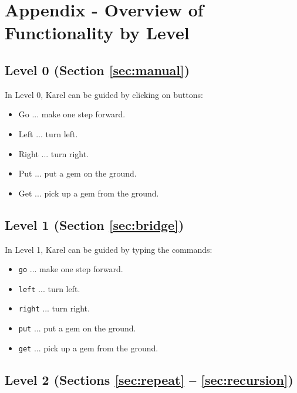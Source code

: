 \documentclass[article,A4,12pt]{llncs}
\begin{document}

\section{Appendix - Overview of Functionality by Level}\label{sec:newfunc3}

\subsection{Level 0 (Section \ref{sec:manual})}

In Level 0, Karel can be guided by clicking on buttons:
\begin{itemize}
\item Go ... make one step forward.
\item Left ... turn left.
\item Right ... turn right.
\item Put ... put a gem on the ground.
\item Get ... pick up a gem from the ground.
\end{itemize}

\subsection{Level 1 (Section \ref{sec:bridge})}

In Level 1, Karel can be guided by typing the commands:
\begin{itemize}
\item {\tt go} ... make one step forward.
\item {\tt left} ... turn left.
\item {\tt right} ... turn right.
\item {\tt put} ... put a gem on the ground.
\item {\tt get} ... pick up a gem from the ground.
\end{itemize}

\subsection{Level 2 (Sections \ref{sec:repeat} -- \ref{sec:recursion})}
\end{document}
